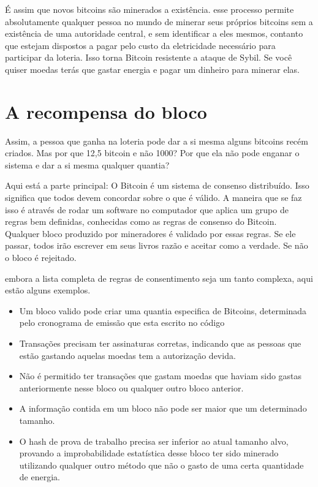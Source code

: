 É assim que novos bitcoins são minerados a existência. esse processo permite absolutamente qualquer pessoa no mundo de minerar seus próprios bitcoins sem a existência de uma autoridade central, e sem identificar a eles mesmos, contanto que estejam dispostos a pagar pelo custo da eletricidade necessário para participar da loteria. Isso torna Bitcoin resistente a ataque de Sybil. Se você quiser moedas terás que gastar energia e pagar um dinheiro para minerar elas.

\section*{A recompensa do bloco}

Assim, a pessoa que ganha na loteria pode dar a si mesma alguns bitcoins recém criados. Mas por que 12,5 bitcoin e não 1000? Por que ela não pode enganar o sistema e dar a si mesma qualquer quantia? 

Aqui está a parte principal: O Bitcoin é um sistema de consenso distribuído. Isso significa que todos devem concordar sobre o que é válido. A maneira que se faz isso é através de rodar um software no computador que aplica um grupo de regras bem definidas, conhecidas como as regras de consenso do Bitcoin. Qualquer bloco produzido por mineradores é validado por essas regras. Se ele passar, todos irão escrever em seus livros razão e aceitar como a verdade. Se não o bloco é rejeitado.

embora a lista completa de regras de consentimento seja um tanto complexa, aqui estão alguns exemplos.
\begin{itemize}
    \item  Um bloco valido pode criar uma quantia especifica de Bitcoins, determinada pelo cronograma de emissão que esta escrito no código
    \item  Transações precisam ter assinaturas corretas, indicando que as pessoas que estão gastando aquelas moedas tem a autorização devida.
    \item Não é permitido ter transações que gastam moedas que haviam sido gastas anteriormente nesse bloco ou qualquer outro bloco anterior.
    \item A informação contida em um bloco não pode ser maior que um determinado tamanho.
    \item O hash de prova de trabalho precisa ser inferior ao atual tamanho alvo, provando a improbabilidade estatística desse bloco ter sido minerado utilizando qualquer outro método que não o gasto de uma certa quantidade de energia.
\end{itemize}
%

